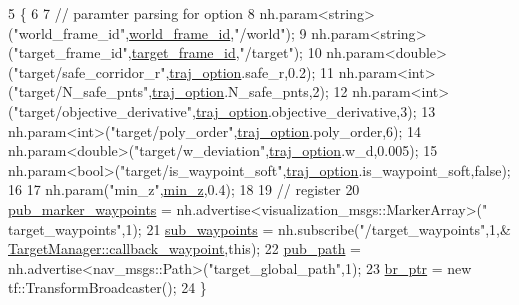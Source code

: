 \begin{DoxyCode}
5                                         \{
6 
7     \textcolor{comment}{// paramter parsing for option }
8     nh.param<\textcolor{keywordtype}{string}>(\textcolor{stringliteral}{"world\_frame\_id"},\hyperlink{class_target_manager_aaab8041311692af50c7e8e3578072df2}{world\_frame\_id},\textcolor{stringliteral}{"/world"});
9     nh.param<\textcolor{keywordtype}{string}>(\textcolor{stringliteral}{"target\_frame\_id"},\hyperlink{class_target_manager_a66612501d5cad51193df0f1adbfc52ed}{target\_frame\_id},\textcolor{stringliteral}{"/target"});
10     nh.param<\textcolor{keywordtype}{double}>(\textcolor{stringliteral}{"target/safe\_corridor\_r"},\hyperlink{class_target_manager_aedeaed09b33f06298fc63d0a87df0f37}{traj\_option}.safe\_r,0.2);
11     nh.param<\textcolor{keywordtype}{int}>(\textcolor{stringliteral}{"target/N\_safe\_pnts"},\hyperlink{class_target_manager_aedeaed09b33f06298fc63d0a87df0f37}{traj\_option}.N\_safe\_pnts,2);
12     nh.param<\textcolor{keywordtype}{int}>(\textcolor{stringliteral}{"target/objective\_derivative"},\hyperlink{class_target_manager_aedeaed09b33f06298fc63d0a87df0f37}{traj\_option}.objective\_derivative,3);
13     nh.param<\textcolor{keywordtype}{int}>(\textcolor{stringliteral}{"target/poly\_order"},\hyperlink{class_target_manager_aedeaed09b33f06298fc63d0a87df0f37}{traj\_option}.poly\_order,6);
14     nh.param<\textcolor{keywordtype}{double}>(\textcolor{stringliteral}{"target/w\_deviation"},\hyperlink{class_target_manager_aedeaed09b33f06298fc63d0a87df0f37}{traj\_option}.w\_d,0.005);
15     nh.param<\textcolor{keywordtype}{bool}>(\textcolor{stringliteral}{"target/is\_waypoint\_soft"},\hyperlink{class_target_manager_aedeaed09b33f06298fc63d0a87df0f37}{traj\_option}.is\_waypoint\_soft,\textcolor{keyword}{false});
16     
17     nh.param(\textcolor{stringliteral}{"min\_z"},\hyperlink{class_target_manager_a4393e564cea5767b9c273fddad4b02b8}{min\_z},0.4);   
18 
19     \textcolor{comment}{// register }
20     \hyperlink{class_target_manager_a676ec1f90b5595ac3dcc5c301d132298}{pub\_marker\_waypoints} = nh.advertise<visualization\_msgs::MarkerArray>(\textcolor{stringliteral}{"
      target\_waypoints"},1);
21     \hyperlink{class_target_manager_ac8faa88743fb19a256daf68d68e081fb}{sub\_waypoints} = nh.subscribe(\textcolor{stringliteral}{"/target\_waypoints"},1,&
      \hyperlink{class_target_manager_adc84c02e4501b1a53556c766d50bc8b5}{TargetManager::callback\_waypoint},\textcolor{keyword}{this});
22     \hyperlink{class_target_manager_a2aecbfd159c039a048a77601f4351504}{pub\_path} = nh.advertise<nav\_msgs::Path>(\textcolor{stringliteral}{"target\_global\_path"},1);
23     \hyperlink{class_target_manager_aa7eaef55d0b3b81ea1e72026730c5fd6}{br\_ptr} = \textcolor{keyword}{new} tf::TransformBroadcaster();
24 \}
\end{DoxyCode}
